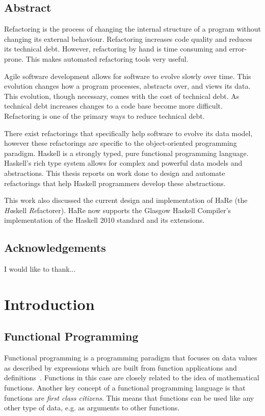 \begin{preface}
\section{Abstract}

Refactoring is the process of changing the internal structure of a program without changing its external behaviour. Refactoring increases code quality and reduces its technical debt. However, refactoring by hand is time consuming and error-prone. This makes automated refactoring tools very useful.

Agile software development allows for software to evolve slowly over time. This evolution changes how a program processes, abstracts over, and views its data. This evolution, though necessary, comes with the cost of technical debt. As technical debt increases changes to a code base become more difficult. Refactoring is one of the primary ways to  reduce technical debt. 

There exist refactorings that specifically help software to evolve its data model, however these refactorings are specific to the object-oriented programming paradigm. Haskell is a strongly typed, pure functional programming language. Haskell's rich type system allows for complex and powerful data models and abstractions. This thesis reports on work done to design and automate refactorings that help Haskell programmers develop these abstractions.

This work also discussed the current design and implementation of HaRe (the \textit{Ha}skell \textit{Re}factorer). HaRe now supports the Glasgow Haskell Compiler's implementation of the Haskell 2010 standard and its extensions. 

\section{Acknowledgements}
I would like to thank...
\end{preface}

\chapter{Introduction}\label{chp:intro}


\section{Functional Programming}
Functional programming is a programming paradigm that focuses on data values as described by expressions which are built from function applications and definitions~\citep{elementsOfFunc}.  Functions in this case are closely related to the idea of mathematical functions. Another key concept of a functional programming language is that functions are \textit{first class citizens}. This means that functions can be used like any other type of data, e.g. as arguments to other functions. 
  
